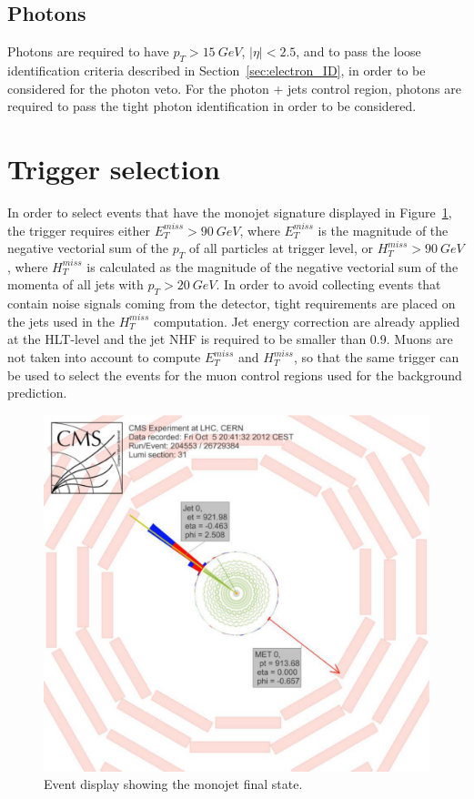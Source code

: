 \subsection{Photons}

Photons are required to have $p_T > \SI{15}{GeV}$, $|\eta| < 2.5$, and to pass the loose identification criteria described in Section~\ref{sec:electron_ID}, in order to be considered for the photon veto. For the photon + jets control region, photons are required to pass the tight photon identification in order to be considered.


\section{Trigger selection}
\label{sec:monojet_trigger}

In order to select events that have the monojet signature displayed in Figure~\ref{fig:monojet_display}, the trigger requires either $E_T^{miss} > \SI{90}{GeV}$, where $E_T^{miss}$ is the magnitude of the negative vectorial sum of the $p_T$ of all particles at trigger level, or $H_T^ {miss} > \SI{90}{GeV}$, where $H_T^{miss}$ is calculated as the magnitude of the negative vectorial sum of the momenta of all jets with $p_T > \SI{20}{GeV}$. In order to avoid collecting events that contain noise signals coming from the detector, tight requirements are placed on the jets used in the $H_T^{miss}$ computation. Jet energy correction are already applied at the \ac{HLT}-level and the jet NHF is required to be smaller than 0.9. Muons are not taken into account to compute $E_T^{miss}$ and $H_T^{miss}$, so that the same trigger can be used to select the events for the muon control regions used for the background prediction.

\begin{figure}[ht]
  \centering
 \includegraphics[width=.6\textwidth]{monojet_event.pdf} 
 \caption{Event display showing the monojet final state.}
 \label{fig:monojet_display}
\end{figure}

